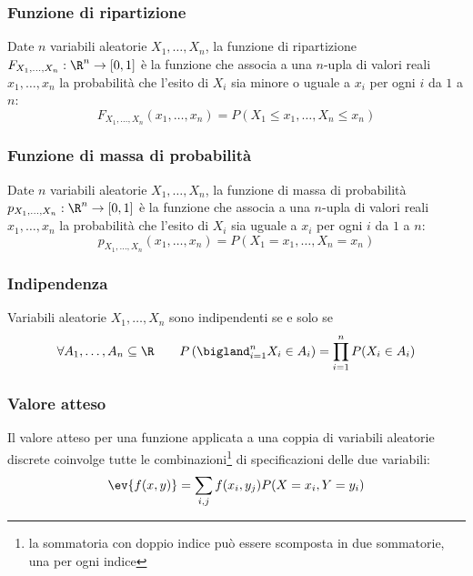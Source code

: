 \subsubsection{Funzione di ripartizione}
\begin{defin}
	Date $n$ variabili aleatorie $X_1, \dots, X_n$, la funzione di ripartizione $F_{X_1,\dots,X_n}:\R^n\to[0,1]$ è la funzione che associa a una $n$-upla di valori reali $x_1,\dots,x_n$ la probabilità che l'esito di $X_i$ sia minore o uguale a $x_i$ per ogni $i$ da $1$ a $n$:
	\begin{equation*}
		F_{X_1,\dots,X_n}(x_1,\dots,x_n) = P(X_1\leq x_1,\dots,X_n\leq x_n)
	\end{equation*}
\end{defin}


\subsubsection{Funzione di massa di probabilità}
\begin{defin}
	Date $n$ variabili aleatorie $X_1, \dots, X_n$, la funzione di massa di probabilità $p_{X_1,\dots,X_n}:\R^n\to[0,1]$ è la funzione che associa a una $n$-upla di valori reali $x_1,\dots,x_n$ la probabilità che l'esito di $X_i$ sia uguale a $x_i$ per ogni $i$ da $1$ a $n$:
	\begin{equation*}
		p_{X_1,\dots,X_n}(x_1,\dots,x_n) = P(X_1=x_1,\dots,X_n=x_n)
	\end{equation*}
\end{defin}


\subsubsection{Indipendenza}
\begin{defin}
	Variabili aleatorie $X_1,\dots,X_n$ sono indipendenti se e solo se
	\begin{equation*}
		\forall A_1,\dots,A_n\subseteq\R \qquad P\left(\bigland_{i=1}^n X_i\in A_i\right) = \prod_{i=1}^n P(X_i\in A_i)
	\end{equation*}
\end{defin}


\subsubsection{Valore atteso}
Il valore atteso per una funzione applicata a una coppia di variabili aleatorie discrete coinvolge tutte le combinazioni\footnote{la sommatoria con doppio indice può essere scomposta in due sommatorie, una per ogni indice} di specificazioni delle due variabili:
\begin{equation*}
	\ev{f(x,y)}=\sum_{i,j}f(x_i,y_j)P(X=x_i,Y=y_i)
\end{equation*}

